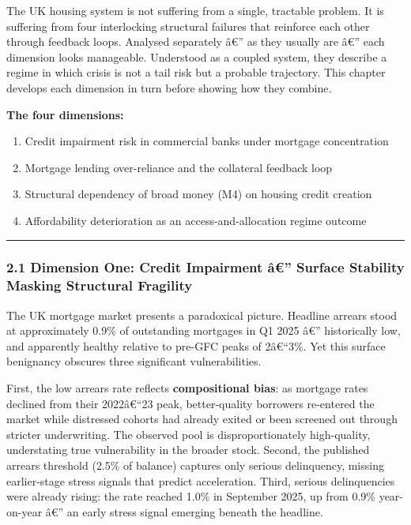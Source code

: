 The UK housing system is not suffering from a single, tractable problem.
It is suffering from four interlocking structural failures that
reinforce each other through feedback loops. Analysed separately â€'' as
they usually are â€'' each dimension looks manageable. Understood as a
coupled system, they describe a regime in which crisis is not a tail
risk but a probable trajectory. This chapter develops each dimension in
turn before showing how they combine.

\textbf{The four dimensions:}

\begin{enumerate}
\def\labelenumi{\arabic{enumi}.}
\tightlist
\item
  Credit impairment risk in commercial banks under mortgage
  concentration
\item
  Mortgage lending over-reliance and the collateral feedback loop
\item
  Structural dependency of broad money (M4) on housing credit creation
\item
  Affordability deterioration as an access-and-allocation regime outcome
\end{enumerate}

\begin{center}\rule{0.5\linewidth}{0.5pt}\end{center}

\subsubsection{2.1 Dimension One: Credit Impairment â€'' Surface
Stability Masking Structural
Fragility}\label{dimension-one-credit-impairment-uxe2-surface-stability-masking-structural-fragility}

The UK mortgage market presents a paradoxical picture. Headline arrears
stood at approximately 0.9\% of outstanding mortgages in Q1 2025 â€''
historically low, and apparently healthy relative to pre-GFC peaks of
2â€``3\%. Yet this surface benignancy obscures three significant
vulnerabilities.

First, the low arrears rate reflects \textbf{compositional bias}: as
mortgage rates declined from their 2022â€``23 peak, better-quality
borrowers re-entered the market while distressed cohorts had already
exited or been screened out through stricter underwriting. The observed
pool is disproportionately high-quality, understating true vulnerability
in the broader stock. Second, the published arrears threshold (2.5\% of
balance) captures only serious delinquency, missing earlier-stage stress
signals that predict acceleration. Third, serious delinquencies were
already rising: the rate reached 1.0\% in September 2025, up from 0.9\%
year-on-year â€'' an early stress signal emerging beneath the headline.

